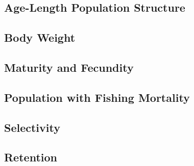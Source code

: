 \documentclass[11pt,
  english,
  letterpaper,
]{article}
\begin{document}
\leavevmode\tagmcend\tagstructend


\hypertarget{age-length-population-structure}{%
\subsection{Age-Length Population Structure}\label{age-length-population-structure}}

\leavevmode\tagmcend\tagstructend


\hypertarget{body-weight}{%
\subsection{Body Weight}\label{body-weight}}

\leavevmode\tagmcend\tagstructend


\hypertarget{maturity-and-fecundity}{%
\subsection{Maturity and Fecundity}\label{maturity-and-fecundity}}

\leavevmode\tagmcend\tagstructend


\hypertarget{population-with-fishing-mortality}{%
\subsection{Population with Fishing Mortality}\label{population-with-fishing-mortality}}

\leavevmode\tagmcend\tagstructend


\hypertarget{selectivity}{%
\subsection{Selectivity}\label{selectivity}}

\leavevmode\tagmcend\tagstructend


\hypertarget{retention}{%
\subsection{Retention}\label{retention}}
\end{document}
